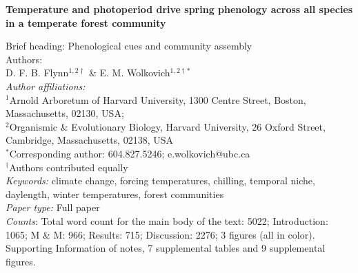 \documentclass[11pt]{article}
\begin{document}
 
  
\noindent \textbf{\large{Temperature and photoperiod drive spring phenology across all species in a temperate forest community}}


\noindent Brief heading: Phenological cues and community assembly\\ 

\noindent Authors:\\
D. F. B. Flynn$^{1,2\dagger}$ \& E. M. Wolkovich$^{1,2\dagger *}$
\vspace{2ex}\\
\emph{Author affiliations:}\\
$^{1}$Arnold Arboretum of Harvard University, 1300 Centre Street, Boston, Massachusetts, 02130, USA; \\
$^{2}$Organismic \& Evolutionary Biology, Harvard University, 26 Oxford Street, Cambridge, Massachusetts, 02138, USA
\vspace{2ex}\\
$^*$Corresponding author: 604.827.5246; e.wolkovich@ubc.ca\\
$^\dagger$Authors contributed equally\\

\noindent \emph{Keywords:} climate change, forcing temperatures, chilling, temporal niche, daylength, winter temperatures, forest communities\\ %
\emph{Paper type:} Full paper\\
 \emph{Counts}: Total word count for the main body of the text:  5022; Introduction: 1065; M \& M: 966; Results: 715; Discussion: 2276; 3 figures (all in color). Supporting Information of notes, 7 supplemental tables and 9 supplemental figures.\\


\end{document}
